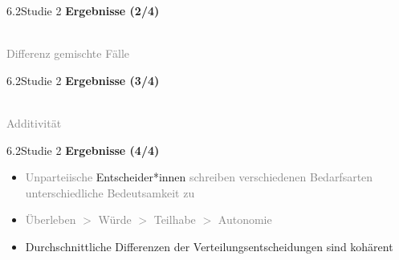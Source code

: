 \documentclass[xcolor=table,9pt,aspectratio=169]{beamer}
\begin{document}
\begin{frame}{\vspace*{10mm}6.2\hspace*{1em}Studie 2}
\textbf{Ergebnisse (2/4)}\\
\medskip
\begin{center}
   \\
   \textcolor{gray}{Differenz gemischte Fälle}
\end{center}
\end{frame}


\begin{frame}{\vspace*{10mm}6.2\hspace*{1em}Studie 2}
\textbf{Ergebnisse (3/4)}\\
\medskip
\begin{center}
   \\
   \textcolor{gray}{Additivität}
\end{center}
\end{frame}


\begin{frame}{\vspace*{10mm}6.2\hspace*{1em}Studie 2}
\textbf{Ergebnisse (4/4)}\\
\medskip
\begin{itemize}
   \item \textcolor{gray}{Unparteiische} Entscheider*innen \textcolor{gray}{schreiben verschiedenen Bedarfsarten unterschiedliche Bedeutsamkeit zu}
   \item \textcolor{gray}{Überleben $>$ Würde $>$ Teilhabe $>$ Autonomie}
   \item Durchschnittliche Differenzen der Verteilungsentscheidungen sind kohärent
\end{itemize}
\end{frame}
\end{document}

